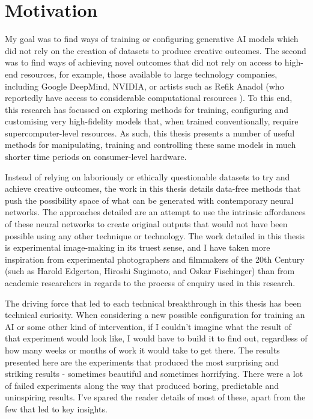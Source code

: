 \section{Motivation}

My goal was to find ways of training or configuring generative AI models which did not rely on the creation of datasets to produce creative outcomes. 
The second was to find ways of achieving novel outcomes that did not rely on access to high-end resources, for example, those available to large technology companies, including Google DeepMind, NVIDIA, or artists such as Refik Anadol (who reportedly have access to considerable computational resources  \citep{caulfield2022refik}). 
To this end, this research has focussed on exploring methods for training, configuring and customising very high-fidelity models that, when trained conventionally, require supercomputer-level resources. 
As such, this thesis presents a number of useful methods for manipulating, training and controlling these same models in much shorter time periods on consumer-level hardware.

Instead of relying on laboriously or ethically questionable datasets to try and achieve creative outcomes, the work in this thesis details data-free methods that push the possibility space of what can be generated with contemporary neural networks.
The approaches detailed are an attempt to use the intrinsic affordances of these neural networks to create original outputs that would not have been possible using any other technique or technology. 
The work detailed in this thesis is experimental image-making in its truest sense, and I have taken more inspiration from experimental photographers and filmmakers of the 20th Century (such as Harold Edgerton, Hiroshi Sugimoto, and Oskar Fischinger) than from academic researchers in regards to the process of enquiry used in this research.

The driving force that led to each technical breakthrough in this thesis has been technical curiosity. 
When considering a new possible configuration for training an AI or some other kind of intervention, if I couldn’t imagine what the result of that experiment would look like, I would have to build it to find out, regardless of how many weeks or months of work it would take to get there. 
The results presented here are the experiments that produced the most surprising and striking results - sometimes beautiful and sometimes horrifying. 
There were a lot of failed experiments along the way that produced boring, predictable and uninspiring results. 
I’ve spared the reader details of most of these, apart from the few that led to key insights.

